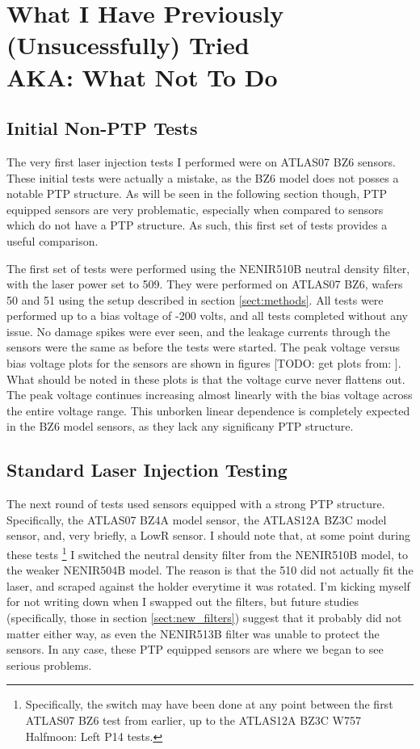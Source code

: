 \documentclass{report}
\begin{document}
            



    \chapter{ What I Have Previously (Unsucessfully) Tried\\ AKA: What Not To Do }
        \section{Initial Non-PTP Tests}
            The very first laser injection tests I performed were on ATLAS07 BZ6 sensors. These initial tests were actually a mistake, as the BZ6 model does not posses a notable PTP structure. As will be seen in the following section though, PTP equipped sensors are very problematic, especially when compared to sensors which do not have a PTP structure. As such, this first set of tests provides a useful comparison.

            The first set of tests were performed using the NENIR510B neutral density filter, with the laser power set to 509. They were performed on ATLAS07 BZ6, wafers 50 and 51 using the setup described in section \ref{sect:methods}. All tests were performed up to a bias voltage of -200 volts, and all tests completed without any issue. No damage spikes were ever seen, and the leakage currents through the sensors were the same as before the tests were started. The peak voltage versus bias voltage plots for the sensors are shown in figures [TODO: get plots from:
            ]. What should be noted in these plots is that the voltage curve never flattens out. The peak voltage continues increasing almost linearly with the bias voltage across the entire voltage range. This unborken linear dependence is completely expected in the BZ6 model sensors, as they lack any significany PTP structure.

        \section{Standard Laser Injection Testing} \label{sect:std_tests}
            The next round of tests used sensors equipped with a strong PTP structure. Specifically, the ATLAS07 BZ4A model sensor, the ATLAS12A BZ3C model sensor, and, very briefly, a LowR sensor. I should note that, at some point during these tests \footnote{Specifically, the switch may have been done at any point between the first ATLAS07 BZ6 test from earlier, up to the ATLAS12A BZ3C W757 Halfmoon: Left P14 tests.} I switched the neutral density filter from the NENIR510B model, to the weaker NENIR504B model. The reason is that the 510 did not actually fit the laser, and scraped against the holder everytime it was rotated. I'm kicking myself for not writing down when I swapped out the filters, but future studies (specifically, those in section \ref{sect:new_filters}) suggest that it probably did not matter either way, as even the NENIR513B filter was unable to protect the sensors. In any case, these PTP equipped sensors are where we began to see serious problems.
            
\end{document}
